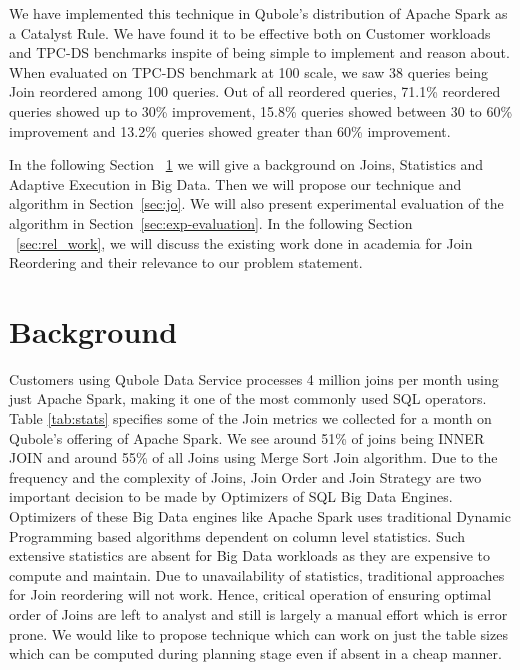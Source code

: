 \documentclass[conference]{IEEEtran}
\begin{document}
We have implemented this technique in Qubole's distribution of Apache Spark as a Catalyst Rule. We have found it to be effective both on Customer workloads and TPC-DS benchmarks inspite of being simple to implement and reason about. When evaluated on TPC-DS benchmark at 100 scale, we saw 38 queries being Join reordered among 100 queries. Out of all reordered queries, 71.1\% reordered queries showed up to 30\% improvement, 15.8\% queries showed between 30 to 60\% improvement and 13.2\% queries showed greater than 60\% improvement.

In the following Section ~\ref{sec:background} we will give a background on Joins, Statistics and Adaptive Execution in Big Data. Then we will propose our technique and algorithm in Section~\ref{sec:jo}. We will also present experimental evaluation of the algorithm in Section~\ref{sec:exp-evaluation}. In the following Section ~\ref{sec:rel_work}, we will discuss the existing work done in academia for Join Reordering and their relevance to our problem statement.

\section{Background}\label{sec:background}

Customers using Qubole Data Service processes 4 million joins per month using just Apache Spark, making it one of the most commonly used SQL operators. Table \ref{tab:stats} specifies some of the Join metrics we collected for a month on Qubole's offering of Apache Spark. We see around 51\% of joins being INNER JOIN and around 55\% of all Joins using Merge Sort Join algorithm. Due to the frequency and the complexity of Joins, Join Order and Join Strategy are two important decision to be made by Optimizers of SQL Big Data Engines. Optimizers of these Big Data engines like Apache Spark uses traditional Dynamic Programming based algorithms \cite{b1} dependent on column level statistics. Such extensive statistics are absent for Big Data workloads as they are expensive to compute and maintain. Due to unavailability of statistics, traditional approaches for Join reordering will not work. Hence, critical operation of ensuring optimal order of Joins are left to analyst and still is largely a manual effort which is error prone. We would like to propose technique which can work on just the table sizes which can be computed during planning stage even if absent in a cheap manner.
\end{document}
